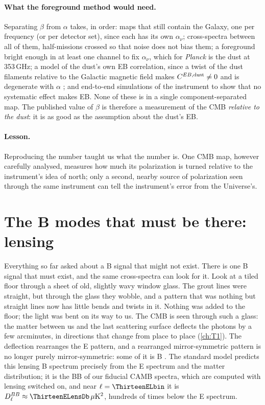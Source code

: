 \paragraph{What the foreground method would need.} Separating $\beta$ from $\alpha$ takes, in order: maps that still
contain the Galaxy, one per frequency (or per detector set), since each has its own $\alpha_\nu$; cross-spectra
between all of them, half-missions crossed so that noise does not bias them; a foreground bright enough in
at least one channel to fix $\alpha_\nu$, which for \textit{Planck} is the dust at 353\,GHz; a model of the dust's own EB
correlation, since a twist of the dust filaments relative to the Galactic magnetic field makes
$C^{EB,{\rm dust}}\ne0$ and is degenerate with $\alpha$ \cite{MinamiKomatsu2020,DiegoPalazuelos2022}; and end-to-end
simulations of the instrument to show that no systematic effect makes EB. None of these is in a single
component-separated map. The published value of $\beta$ is therefore a measurement of the CMB \emph{relative
to the dust}: it is as good as the assumption about the dust's EB.

\paragraph{Lesson.} Reproducing the number taught us what the number is. One CMB map, however carefully
analysed, measures how much its polarization is turned relative to the instrument's idea of north; only a
second, nearby source of polarization seen through the same instrument can tell the instrument's error from
the Universe's.
\section{The B modes that must be there: lensing}
\label{13e:sec:bmodes}

Everything so far asked about a B signal that might not exist. There is one B signal that must exist,
and the same cross-spectra can look for it. Look at a tiled floor through a sheet of old, slightly wavy
window glass. The grout lines were straight, but through the glass they wobble, and a pattern that was
nothing but straight lines now has little bends and twists in it. Nothing was added to the floor; the
light was bent on its way to us. The CMB is seen through such a glass: the matter between us and the last
scattering surface deflects the photons by a few arcminutes, in directions that change from place to place
(\cref{ch:T1}). The deflection rearranges the E pattern, and a rearranged mirror-symmetric pattern is no
longer purely mirror-symmetric: some of it is B \cite{ZaldarriagaSeljak1998,LewisChallinor2006}. The
standard model predicts this lensing B spectrum precisely from the E spectrum and the matter
distribution; it is the BB of our fiducial CAMB spectra, which are computed with lensing switched on, and near $\ell=\ThirteenELbin$ it is
$D^{BB}_\ell\approx\ThirteenELensDb\,\mu{\rm K}^2$, hundreds of times below the E spectrum.

